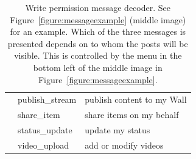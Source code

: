 \documentclass[10pt]{sig-alternate-10pt}
\begin{document}
\begin{table}[htbp]
\begin{tabular}{|l|l|l|}
    & publish\_stream     & publish content to my Wall          \\ \cline{2-3} 
    & share\_item         & share items on my behalf            \\ \cline{2-3} 
    & status\_update      & update my status                    \\ \cline{2-3} 
    & video\_upload       & add or modify videos                \\ \hline
  \end{tabular}
  \caption{Write permission message decoder. See Figure~\ref{figure:messageexample} (middle image) for an example. Which of the three messages is presented depends on to whom the posts will be visible. This is controlled by the menu in the bottom left of the middle image in Figure~\ref{figure:messageexample}.}
  \label{table:messagesw}
\end{table}
\end{document}
